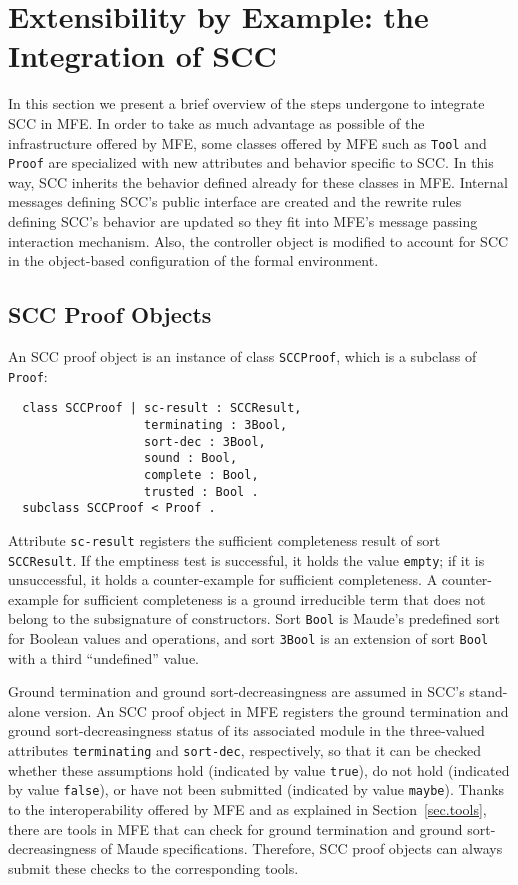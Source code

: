 \section{Extensibility by Example: the Integration of SCC}
\label{sec.extend}

In this section we present a brief overview of 
the steps undergone to integrate SCC in MFE.
In order to take as much advantage as possible
of the infrastructure offered by MFE, some classes offered by MFE
such as {\tt Tool} and {\tt Proof}
are specialized with new attributes and behavior specific to SCC. In this way,
SCC inherits the behavior defined already for these classes in MFE.
Internal messages defining SCC's public interface
are created and the rewrite rules defining SCC's behavior
are updated so they fit into MFE's message passing interaction mechanism.
Also, the controller object is modified 
to account for SCC in the object-based configuration of 
the formal environment.

\subsection{SCC Proof Objects}

An SCC proof object is an instance of class {\tt SCCProof},
which is a subclass of {\tt Proof}:

\begin{small}
\begin{verbatim}
  class SCCProof | sc-result : SCCResult,
                   terminating : 3Bool,
                   sort-dec : 3Bool,
                   sound : Bool,
                   complete : Bool,
                   trusted : Bool .
  subclass SCCProof < Proof .
\end{verbatim}
\end{small}
%
Attribute {\tt sc-result} registers the sufficient completeness
result of sort {\tt SCCResult}.
If the emptiness test is successful, it holds the
value {\tt empty}; if it is unsuccessful, it
holds a counter-example for sufficient completeness. A counter-example
for sufficient completeness is a ground irreducible term that does
not belong to the subsignature of constructors. Sort {\tt Bool} is
Maude's predefined sort for Boolean values and operations,
and sort {\tt 3Bool} is an extension
of sort {\tt Bool} with a third ``undefined'' value.

Ground termination and ground sort-decreasingness
are assumed in SCC's stand-alone version. 
An SCC proof object in MFE registers the ground
termination and ground sort-decreasingness status of its associated 
module in the three-valued attributes {\tt termi\-nating} and {\tt sort-dec}, respectively,
so that it can be checked whether these assumptions hold (indicated by value {\tt true}),
do not hold (indicated by value {\tt false}), or have not been submitted (indicated
by value {\tt maybe}).
Thanks to
the interoperability offered by MFE and as explained 
in Section~\ref{sec.tools}, 
there are tools in MFE that can 
check for ground termination and ground sort-decreasingness of Maude
specifications. Therefore, SCC proof objects
can always submit these checks to the corresponding tools.

